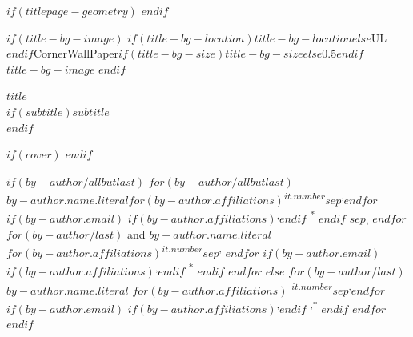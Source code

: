 
$if(titlepage-geometry)$
$endif$
\begin{minipage}[b][\textheight][s]{\textwidth}


\raggedright


$if(title-bg-image)$
\This$if(title-bg-location)$$title-bg-location$$else$UL$endif$CornerWallPaper{$if(title-bg-size)$$title-bg-size$$else$0.5$endif$}{$title-bg-image$}
$endif$


{\huge\bfseries\nohyphens{$title$}}\\[1\baselineskip]

$if(subtitle)${\large{$subtitle$}}\\[4\baselineskip]$endif$

\vspace{1\baselineskip}

$if(cover)$
$endif$

\vspace{1\baselineskip}

$if(by-author/allbutlast)$
$for(by-author/allbutlast)$
 {\large{$by-author.name.literal$}}$for(by-author.affiliations)${\textsuperscript{$it.number$}}$sep$\textsuperscript{,}$endfor$%
$if(by-author.email)$%
$if(by-author.affiliations)$\textsuperscript{,}$endif$%
{\textsuperscript{*}}%
$endif$%
$sep$,
$endfor$
$for(by-author/last)$%
{ and \large{$by-author.name.literal$}}%
$for(by-author.affiliations)${\textsuperscript{$it.number$}}$sep$\textsuperscript{,}%
$endfor$%
$if(by-author.email)$%
$if(by-author.affiliations)$\textsuperscript{,}$endif$%
{\textsuperscript{*}}%
$endif$%
$endfor$
$else$
$for(by-author/last)$%
{\large{$by-author.name.literal$}}%
$for(by-author.affiliations)$%
{\textsuperscript{$it.number$}}$sep$\textsuperscript{,}$endfor$%
$if(by-author.email)$%
$if(by-author.affiliations)$\textsuperscript{,}$endif$%
{\textsuperscript{,*}}%
$endif$%
$endfor$
$endif$


\end{minipage}

